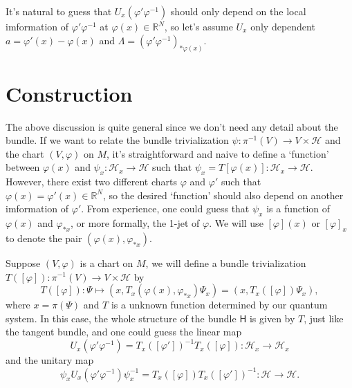 \documentclass[12pt]{article}
\theoremstyle{definition}
\theoremstyle{plain}
\begin{document}
It's natural to guess that $U_x(\varphi'\varphi^{-1})$ should only depend on the local imformation of $\varphi'\varphi^{-1}$ at $\varphi(x)\in \mathbb R^N$, so let's assume $U_x$ only dependent $a=\varphi'(x)-\varphi(x)$ and $\Lambda=(\varphi'\varphi^{-1})_{*\varphi(x)}$.

\section{Construction}

The above discussion is quite general since we don't need any detail about the bundle. If we want to relate the bundle trivialization $\psi:\pi^{-1}(V)\to V\times \mathcal H$ and the chart $(V,\varphi)$ on $M$, it's straightforward and naive to define a `function' between $\varphi(x)$ and $\psi_x:\mathcal H_x\to \mathcal H$ such that $\psi_x=T[\varphi(x)]:\mathcal H_x\to \mathcal H$. However, there exist two different charts $\varphi$ and $\varphi'$ such that $\varphi(x)=\varphi'(x)\in \mathbb R^N$, so the desired `function' should also depend on another imformation of $\varphi'$. 
From experience, one could guess that $\psi_x$ is a function of $\varphi(x)$ and $\varphi_{*x}$, or more formally, the 1-jet of $\varphi$. We will use $[\varphi](x)$ or $[\varphi]_x$ to denote the pair $(\varphi(x),\varphi_{*x})$.

Suppose $(V,\varphi)$ is a chart on $M$, we will define a bundle trivialization $T([\varphi]):\pi^{-1}(V)\to V\times \mathcal H$ by 
\[
	T([\varphi]):\Psi\mapsto (x,T_x(\varphi(x),\varphi_{*x})\Psi_x)=(x,T_x([\varphi])\Psi_x),
\]
where $x=\pi(\Psi)$ and $T$ is a unknown function determined by our quantum system. In this case, the whole structure of the bundle $\mathsf H$ is given by $T$, just like the tangent bundle, and one could guess the linear map
\begin{equation}
	U_x(\varphi'\varphi^{-1})=T_{x}([\varphi'])^{-1}T_{x}([\varphi]):\mathcal H_x\to \mathcal H_x
\end{equation}
and the unitary map
\[
	\psi_x U_x(\varphi'\varphi^{-1})\psi_x^{-1}=T_{x}([\varphi])T_{x}([\varphi'])^{-1}:\mathcal H\to \mathcal H.
\]

\end{document}
